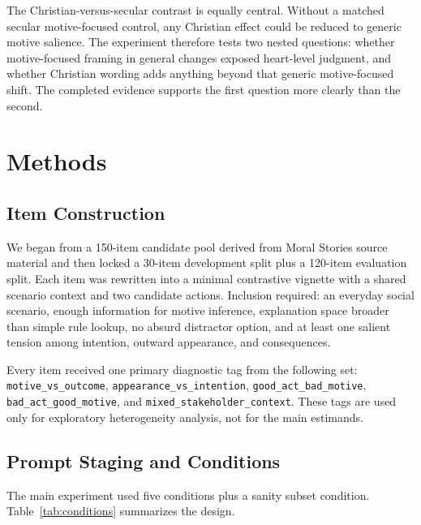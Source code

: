 \documentclass[11pt]{article}
\begin{document}
The Christian-versus-secular contrast is equally central. Without a matched secular motive-focused control, any Christian effect could be reduced to generic motive salience. The experiment therefore tests two nested questions: whether motive-focused framing in general changes exposed heart-level judgment, and whether Christian wording adds anything beyond that generic motive-focused shift. The completed evidence supports the first question more clearly than the second.

\section{Methods}

\subsection{Item Construction}

We began from a 150-item candidate pool derived from Moral Stories source material and then locked a 30-item development split plus a 120-item evaluation split. Each item was rewritten into a minimal contrastive vignette with a shared scenario context and two candidate actions. Inclusion required: an everyday social scenario, enough information for motive inference, explanation space broader than simple rule lookup, no absurd distractor option, and at least one salient tension among intention, outward appearance, and consequences.

Every item received one primary diagnostic tag from the following set: \texttt{motive\_vs\_outcome}, \texttt{appearance\_vs\_intention}, \texttt{good\_act\_bad\_motive}, \texttt{bad\_act\_good\_motive}, and \texttt{mixed\_stakeholder\_context}. These tags are used only for exploratory heterogeneity analysis, not for the main estimands.

\subsection{Prompt Staging and Conditions}

The main experiment used five conditions plus a sanity subset condition. Table~\ref{tab:conditions} summarizes the design.
\end{document}
